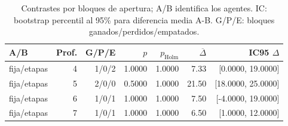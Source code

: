\begin{table}[htbp]
\centering\small
\caption{Contrastes por bloques de apertura; A/B identifica los agentes. IC: bootstrap percentil al 95\% para diferencia media A-B. G/P/E: bloques ganados/perdidos/empatados.}
\label{tab:othello_inferencia}
\begin{tabular}{lrrrrrr}
\toprule
A/B & Prof. & G/P/E & $p$ & $p_{\mathrm{Holm}}$ & $\overline{\Delta}$ & IC95 $\Delta$ \\
\midrule
fija/etapas & 4 & 1/0/2 & 1.0000 & 1.0000 & 7.33 & [0.0000, 19.0000] \\
fija/etapas & 5 & 2/0/0 & 0.5000 & 1.0000 & 21.50 & [18.0000, 25.0000] \\
fija/etapas & 6 & 1/0/1 & 1.0000 & 1.0000 & 7.50 & [-4.0000, 19.0000] \\
fija/etapas & 7 & 1/0/1 & 1.0000 & 1.0000 & 6.50 & [1.0000, 12.0000] \\
\bottomrule
\end{tabular}
\end{table}

